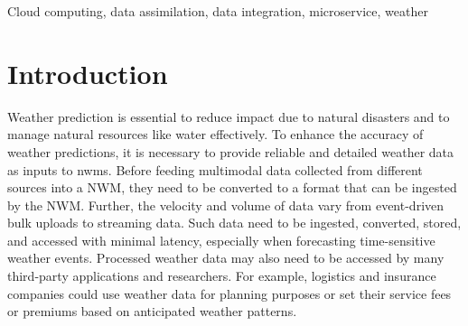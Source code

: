 \documentclass[conference]{IEEEtran}
\begin{document}
\begin{IEEEkeywords}
Cloud computing, data assimilation, data integration, microservice, weather
\end{IEEEkeywords}

\section{Introduction}
\label{pse:Introduction}

Weather prediction is essential to reduce impact due to natural disasters and to manage natural resources like water effectively. To enhance the accuracy of weather predictions, it is necessary to provide reliable and detailed weather data as inputs to \acrfull{nwm}s. Before feeding multimodal data collected from different sources into a NWM, they need to be converted to a format that can be ingested by the NWM. Further, the velocity and volume of data vary from event-driven bulk uploads to streaming data. Such data need to be ingested, converted, stored, and accessed with minimal latency, especially when forecasting time-sensitive weather events. Processed weather data may also need to be accessed by many third-party applications and researchers. For example, logistics and insurance companies could use weather data for planning purposes or set their service fees or premiums based on anticipated weather patterns.
\end{document}
